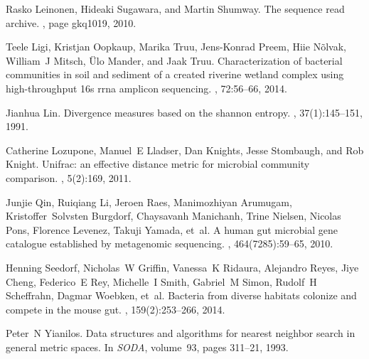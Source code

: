 \documentclass[10pt,letterpaper]{article}
\begin{document}
\begin{thebibliography}{10}
Rasko Leinonen, Hideaki Sugawara, and Martin Shumway.
\newblock The sequence read archive.
, page gkq1019, 2010.

Teele Ligi, Kristjan Oopkaup, Marika Truu, Jens-Konrad Preem, Hiie N{\~o}lvak,
  William~J Mitsch, {\"U}lo Mander, and Jaak Truu.
\newblock Characterization of bacterial communities in soil and sediment of a
  created riverine wetland complex using high-throughput 16s rrna amplicon
  sequencing.
, 72:56--66, 2014.

Jianhua Lin.
\newblock Divergence measures based on the shannon entropy.
, 37(1):145--151, 1991.

Catherine Lozupone, Manuel~E Lladser, Dan Knights, Jesse Stombaugh, and Rob
  Knight.
\newblock Unifrac: an effective distance metric for microbial community
  comparison.
, 5(2):169, 2011.

Junjie Qin, Ruiqiang Li, Jeroen Raes, Manimozhiyan Arumugam,
  Kristoffer~Solvsten Burgdorf, Chaysavanh Manichanh, Trine Nielsen, Nicolas
  Pons, Florence Levenez, Takuji Yamada, et~al.
\newblock A human gut microbial gene catalogue established by metagenomic
  sequencing.
, 464(7285):59--65, 2010.

Henning Seedorf, Nicholas~W Griffin, Vanessa~K Ridaura, Alejandro Reyes, Jiye
  Cheng, Federico~E Rey, Michelle~I Smith, Gabriel~M Simon, Rudolf~H
  Scheffrahn, Dagmar Woebken, et~al.
\newblock Bacteria from diverse habitats colonize and compete in the mouse gut.
, 159(2):253--266, 2014.

Peter~N Yianilos.
\newblock Data structures and algorithms for nearest neighbor search in general
  metric spaces.
\newblock In {\em SODA}, volume~93, pages 311--21, 1993.

\end{thebibliography}
\end{document}

